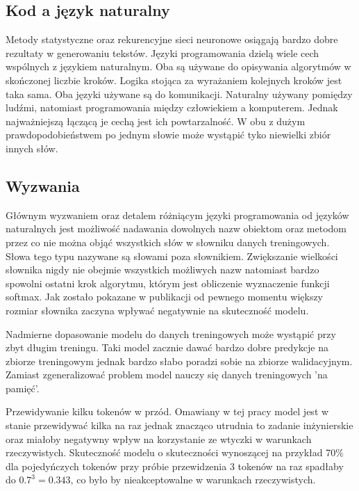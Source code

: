 \subsection {Kod a język naturalny}
Metody statystyczne oraz rekurencyjne sieci neuronowe osiągają bardzo dobre rezultaty w generowaniu tekstów. 
Języki programowania dzielą wiele cech wspólnych z językiem naturalnym. Oba są używane do opisywania algorytmów 
w skończonej liczbie kroków. Logika stojąca za wyrażaniem kolejnych kroków jest taka sama. Oba języki używane są 
do komunikacji. Naturalny używany pomiędzy ludźmi, natomiast programowania między człowiekiem a komputerem. 
Jednak najważniejszą łączącą je cechą jest ich powtarzalność. W obu z dużym prawdopodobieństwem po jednym 
słowie może wystąpić tyko niewielki zbiór innych słów. 

\subsection {Wyzwania}
Głównym wyzwaniem oraz detalem różniącym języki programowania od języków naturalnych jest możliwość nadawania dowolnych
nazw obiektom oraz metodom przez co nie można objąć wszystkich słów w słowniku danych treningowych. Słowa tego typu 
nazywane są słowami poza słownikiem. Zwiększanie wielkości słownika nigdy nie obejmie wszystkich możliwych nazw natomiast 
bardzo spowolni ostatni krok algorytmu, którym jest obliczenie wyznaczenie funkcji softmax. Jak zostało pokazane w publikacji 
\cite{hellendoorn} od pewnego momentu większy rozmiar słownika zaczyna wpływać negatywnie na skuteczność modelu. 

Nadmierne dopasowanie modelu do danych treningowych może wystąpić przy zbyt długim treningu. Taki model 
zacznie dawać bardzo dobre predykcje na zbiorze treningowym jednak bardzo słabo poradzi sobie na zbiorze 
walidacyjnym. Zamiast zgeneralizować problem model nauczy się danych treningowych 'na pamięć'. 

Przewidywanie kilku tokenów w przód. Omawiany w tej pracy model jest w stanie przewidywać kilka na raz 
jednak znacząco utrudnia to zadanie inżynierskie oraz miałoby negatywny wpływ na korzystanie ze wtyczki 
w warunkach rzeczywistych. Skuteczność modelu o skuteczności wynoszącej na przykład {70\%} dla pojedyńczych 
tokenów przy próbie przewidzenia 3 tokenów na raz spadłaby do \begin{math}0.7^3 = 0.343\end{math}, co było by nieakceptowalne 
w warunkach rzeczywistych. 

